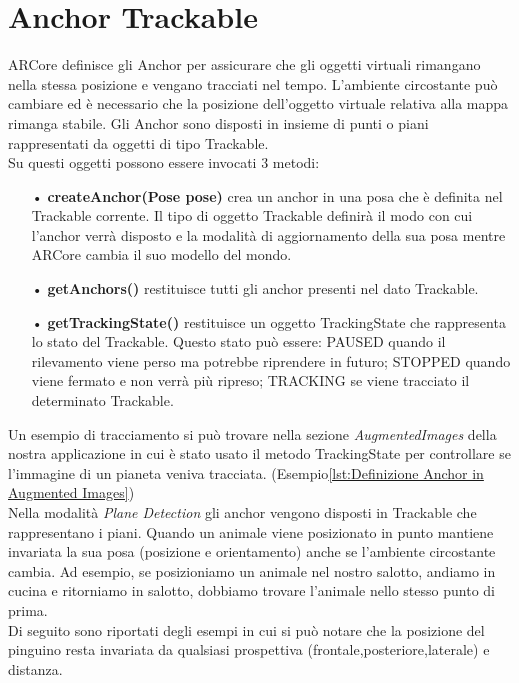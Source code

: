 \documentclass[crop=false, class=book]{standalone}
\begin{document}
		
	\chapter{Anchor Trackable}
	
		ARCore definisce gli Anchor per assicurare che gli oggetti virtuali rimangano nella stessa posizione e vengano 					tracciati nel tempo. L'ambiente circostante può cambiare ed è necessario che la posizione dell'oggetto virtuale 				relativa alla mappa rimanga stabile. Gli Anchor sono disposti in insieme di punti o piani rappresentati da oggetti di 			tipo Trackable. \\
		Su questi oggetti possono essere invocati 3 metodi:
		\begin{itemize}
			\item[•] \textbf{createAnchor(Pose pose)} crea un anchor in una posa che è definita nel Trackable corrente. Il tipo di oggetto Trackable definirà il modo con cui l'anchor verrà disposto e la modalità di aggiornamento della sua posa mentre ARCore cambia il suo modello del mondo.
			\item[•] \textbf{ getAnchors()} restituisce tutti gli anchor presenti nel dato Trackable.
			\item[•] \textbf{getTrackingState()} restituisce un oggetto TrackingState che rappresenta lo stato del Trackable. Questo stato può essere: PAUSED quando il rilevamento viene perso ma potrebbe riprendere in futuro; STOPPED quando viene fermato e non verrà più ripreso; TRACKING se viene tracciato il determinato Trackable.
		\end{itemize}

	\begin{flushleft}
		Un esempio di tracciamento si può trovare nella sezione \emph{AugmentedImages} della nostra applicazione in cui è stato 		usato il metodo TrackingState per controllare se l'immagine di un pianeta veniva tracciata. 		 			(Esempio\vref{lst:Definizione Anchor in Augmented Images})\\
		Nella modalità \emph{Plane Detection} gli anchor vengono disposti in Trackable che rappresentano i piani. Quando un animale viene posizionato in punto mantiene invariata la sua posa (posizione e orientamento) anche se l'ambiente circostante cambia. Ad esempio, se posizioniamo un animale nel nostro salotto, andiamo in cucina e ritorniamo in salotto, dobbiamo trovare l'animale nello stesso punto di prima.\\
		
		Di seguito sono riportati degli esempi in cui si può notare che la posizione del pinguino resta invariata da qualsiasi 			prospettiva (frontale,posteriore,laterale) e distanza.
	\end{flushleft}
	
\end{document}
